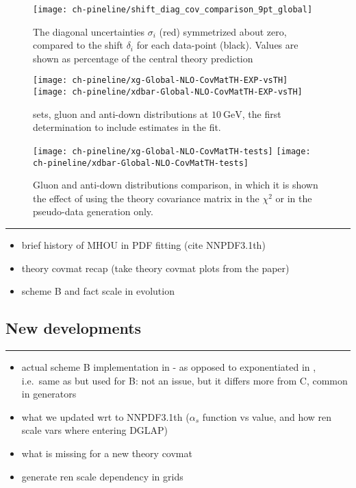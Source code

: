 \begin{figure}
	\centering
	\texttt{[image: ch-pineline/shift\_diag\_cov\_comparison\_9pt\_global]}
	\caption{
		The diagonal uncertainties $\sigma_i$ (red) symmetrized about zero,
		compared to the shift $\delta_i$ for each data-point (black).
		Values are shown as percentage of the central theory prediction
	}
	\label{fig:pine/scvar-shifts}
\end{figure}

\begin{figure}
	\centering
	\texttt{[image: ch-pineline/xg-Global-NLO-CovMatTH-EXP-vsTH]}
	\texttt{[image: ch-pineline/xdbar-Global-NLO-CovMatTH-EXP-vsTH]}
	\caption{
		 \nlo sets, gluon and anti-down distributions at
		$\SI{10}{\giga\electronvolt}$, the first \pdf determination to include
		\mhou estimates in the fit.
	}
	\label{fig:pine/3.1th}
\end{figure}

\begin{figure}
	\centering
	\texttt{[image: ch-pineline/xg-Global-NLO-CovMatTH-tests]}
	\texttt{[image: ch-pineline/xdbar-Global-NLO-CovMatTH-tests]}
	\caption{
		Gluon and anti-down distributions comparison, in which it is shown the
		effect of using the theory covariance matrix in the $\chi^2$ or in the
		pseudo-data generation only.
	}
	\label{fig:pine/3.1th-tests}
\end{figure}


\vspace*{20pt}
\noindent
\rule{\hsize}{1pt}

\begin{itemize}
	\item brief history of MHOU in PDF fitting (cite NNPDF3.1th)
	\item theory covmat recap (take theory covmat plots from the paper)
	\item scheme B and fact scale in evolution
\end{itemize}

\subsection{New developments}
\label{sec:pine/mhou-pdf-new}

\vspace*{20pt}
\noindent
\rule{\hsize}{1pt}

\begin{itemize}
	\item actual scheme B implementation in \eko - as opposed to exponentiated
		in \apfel, i.e.\ same as \pegasus but used for B: not an issue, but it
		differs more from C, common in \mc generators
	\item what we updated wrt to NNPDF3.1th ($\alpha_s$ function vs value, and
		how ren scale vars where entering DGLAP)
	\item what is missing for a new theory covmat
	\item generate ren scale dependency in grids
\end{itemize}

